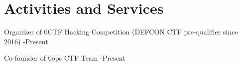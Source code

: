 \section*{Activities and Services}
\begin{description}
\item Organizer of 0CTF Hacking Competition (DEFCON CTF pre-qualifier since 2016) -Present
\item Co-founder of 0ops CTF Team -Present
\end{description}
